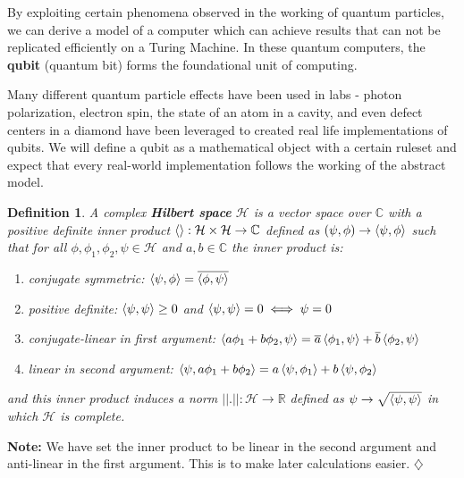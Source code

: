 \documentclass[12pt,twoside,fleqn]{report}
\theoremstyle{thmstyle}
\newtheorem{defn}{Definition}[chapter]
\newenvironment{note}{\textbf{Note:}}{\hfill\ensuremath{\diamondsuit}}
\begin{document}
By exploiting certain phenomena observed in the working of quantum particles, we can derive a model of a computer which can achieve results that can not be replicated efficiently on a Turing Machine. In these quantum computers, the \textbf{qubit} (quantum bit) forms the foundational unit of computing.

Many different quantum particle effects have been used in labs - photon polarization, electron spin, the state of an atom in a cavity, and even defect centers in a diamond have been leveraged to created real life implementations of qubits. We will define a qubit as a mathematical object with a certain ruleset and expect that every real-world implementation follows the working of the abstract model.

\begin{samepage}
\begin{defn}
    A complex \textbf{Hilbert space} $\mathcal{H}$ is a vector space over $\mathbb{C}$ with a positive definite inner product $\braket{} : \mathcal{H} \times \mathcal{H} \to \mathbb{C}$ defined as $(\psi,\phi) \to \braket{\psi,\phi}$ such that for all $\phi, \phi_1, \phi_2, \psi \in \mathcal{H}$ and $a, b \in \mathbb{C}$ the inner product is:
    \begin{enumerate}
        \item conjugate symmetric: $\braket{\psi,\phi} = \overline{\braket{\phi,\psi}}$
        \item positive definite: $\braket{\psi, \psi} \geq 0$ and $\braket{\psi, \psi} = 0 \iff \psi = 0$
        \item conjugate-linear in first argument: $\braket{a \phi_1 + b \phi_2, \psi} = \overline{a} \braket{\phi_1, \psi} + \overline{b} \braket{\phi_2, \psi}$
        \item linear in second argument: $\braket{\psi, a \phi_1 + b \phi_2} = a \braket{\psi,\phi_1} + b \braket{\psi,\phi_2}$
    \end{enumerate}
    and this inner product induces a norm $||.|| : \mathcal{H} \to \mathbb{R}$ defined as $\psi \to \sqrt{\braket{\psi,\psi}}$ in which $\mathcal{H}$ is complete.
\end{defn}

\begin{note}
    We have set the inner product to be linear in the second argument and anti-linear in the first argument. This is to make later calculations easier.
\end{note}
\end{samepage}
\end{document}
